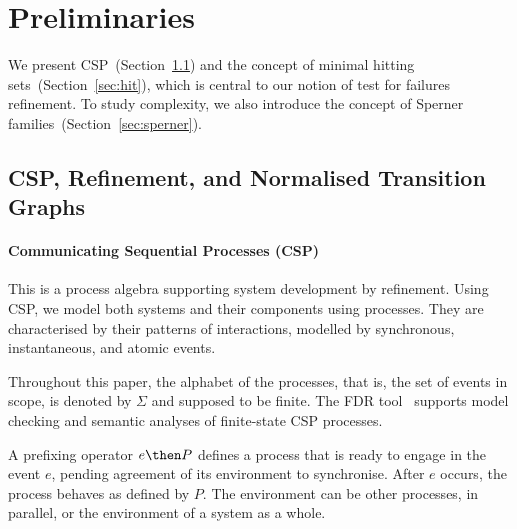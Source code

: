 \documentclass[3p,times]{elsarticle}
\begin{document}

\section{Preliminaries}
\label{section:preliminaries}

We present CSP~(Section~\ref{section:csp}) and the concept of minimal hitting
sets~(Section~\ref{sec:hit}), which is central to our notion of test
for failures refinement. To study complexity, we also introduce the concept
of Sperner families~(Section~\ref{sec:sperner}).

\subsection{CSP, Refinement, and Normalised Transition Graphs}
\label{section:csp}

\paragraph{Communicating Sequential Processes (CSP)} This is a process algebra supporting
system development by refinement. Using CSP, we model both systems and their
components using processes. They are characterised by their patterns of
interactions, modelled by synchronous, instantaneous, and atomic events.

Throughout this paper, the alphabet of the processes, that is, the set of
events in scope, is denoted by $\Sigma$ and supposed to be finite.
The FDR tool~\cite{fdr} supports model checking and semantic analyses of
finite-state CSP processes.

A prefixing operator $e \then P$ defines a process that is ready to engage in
the event $e$, pending agreement of its environment to synchronise. After $e$
occurs, the process behaves as defined by $P$. The environment can be other
processes, in parallel, or the environment of a system as a whole.
\end{document}
